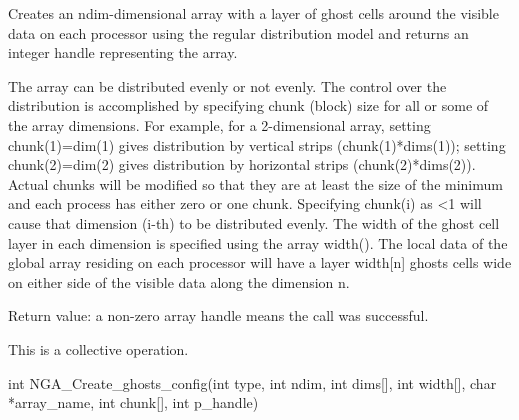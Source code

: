 \documentclass[12pt]{article}
\begin{document}
\dcoll

\begin{desc}

  Creates an ndim-dimensional array with a layer of ghost cells around
  the visible data on each processor using the regular distribution
  model and returns an integer handle representing the array.

  The array can be distributed evenly or not evenly. The control over
  the distribution is accomplished by specifying chunk (block) size
  for all or some of the array dimensions. For example, for a
  2-dimensional array, setting chunk(1)=dim(1) gives distribution by
  vertical strips (chunk(1)*dims(1)); setting chunk(2)=dim(2) gives
  distribution by horizontal strips (chunk(2)*dims(2)). Actual chunks
  will be modified so that they are at least the size of the minimum
  and each process has either zero or one chunk. Specifying chunk(i)
  as \textless 1 will cause that dimension (i-th) to be distributed evenly. The
  width of the ghost cell layer in each dimension is specified using
  the array width(). The local data of the global array residing on
  each processor will have a layer width[n] ghosts cells wide on
  either side of the visible data along the dimension n.

  Return value: a non-zero array handle means the call was successful.

  This is a collective operation.
\end{desc}



\begin{capi}
\begin{ccode}
int NGA_Create_ghosts_config(int type, int ndim, int dims[], 
                             int width[], char *array_name, int chunk[], 
                             int p_handle)
\end{ccode}
\begin{funcargs}
\end{funcargs}
\end{capi}
\end{document}
